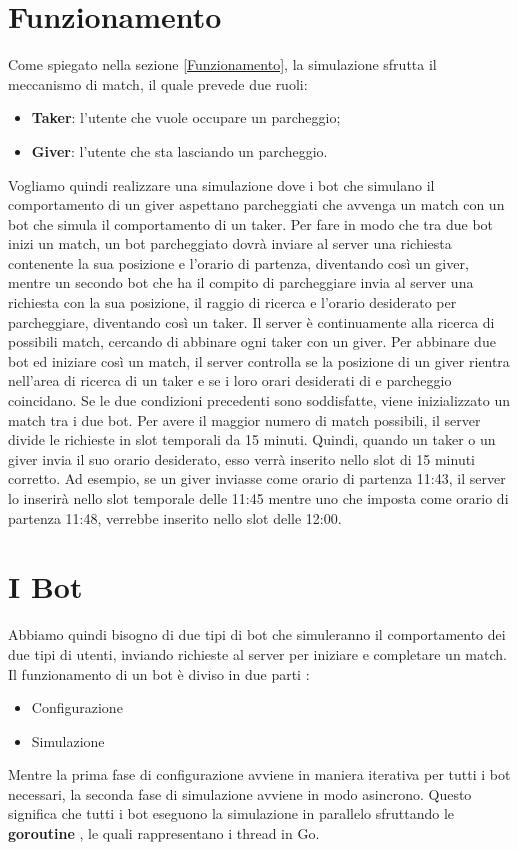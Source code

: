 \documentclass[main.tex]{subfiles}
\begin{document}
\section{Funzionamento}
Come spiegato nella sezione \ref{Funzionamento}, la simulazione sfrutta il meccanismo di match, il quale prevede due ruoli:
\begin{itemize}
    \item \textbf{Taker}: l'utente che vuole occupare un parcheggio;
    \item \textbf{Giver}: l'utente che sta lasciando un parcheggio.
\end{itemize}
Vogliamo quindi realizzare una simulazione dove i bot che simulano il comportamento di un giver aspettano parcheggiati che avvenga un match con un bot che simula il comportamento di un taker.\newline
Per fare in modo che tra due bot inizi un match, un bot parcheggiato dovrà inviare al server una richiesta contenente la sua posizione e l'orario di partenza, diventando così un giver, mentre un secondo bot che ha il compito di parcheggiare invia al server una richiesta con la sua posizione, il raggio di ricerca e l'orario desiderato per parcheggiare, diventando così un taker.\newline
Il server è continuamente alla ricerca di possibili match, cercando di abbinare ogni taker con un giver. Per abbinare due bot ed iniziare così un match, il server controlla se la posizione di un giver rientra nell'area di ricerca di un taker e se i loro orari desiderati di  e parcheggio coincidano. Se le due condizioni precedenti sono soddisfatte, viene inizializzato un match tra i due bot. \newline
Per avere il maggior numero di match possibili, il server divide le richieste in slot temporali da 15 minuti. Quindi, quando un taker o un giver invia il suo orario desiderato, esso verrà inserito nello slot di 15 minuti corretto. Ad esempio, se un giver inviasse come orario di partenza 11:43, il server lo inserirà nello slot temporale delle 11:45 mentre uno che imposta come orario di partenza 11:48, verrebbe inserito nello slot delle 12:00.


\section{I Bot}
Abbiamo quindi bisogno di due tipi di bot che simuleranno il comportamento dei due tipi di utenti, inviando richieste al server per iniziare e completare un match.\newline
Il funzionamento di un bot è diviso in due parti :
\begin{itemize}
    \item {Configurazione}
    \item {Simulazione}
\end{itemize}
Mentre la prima fase di configurazione avviene in maniera iterativa per tutti i bot necessari, la seconda fase di simulazione avviene in modo asincrono. Questo significa che tutti i bot eseguono la simulazione in parallelo sfruttando le \textbf{goroutine} \cite{Goroutine}, le quali rappresentano i thread in Go.
\end{document}
